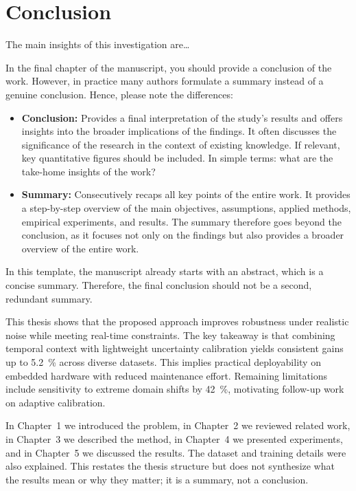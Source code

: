 \chapter{Conclusion}
\label{cha:conclusion}

The main insights of this investigation are\ldots
\begin{infobox}[title={Conclusion vs. summary}]
	In the final chapter of the manuscript, you should provide a conclusion of the work. However, in practice many authors formulate a summary instead of a genuine conclusion. Hence, please note the differences:
	\begin{itemize}
		\item \textbf{Conclusion:} Provides a final interpretation of the study's results and offers insights into the broader implications of the findings. It often discusses the significance of the research in the context of existing knowledge. If relevant, key quantitative figures should be included. In simple terms: what are the take-home insights of the work?
		\item \textbf{Summary:} Consecutively recaps all key points of the entire work. It provides a step-by-step overview of the main objectives, assumptions, applied methods, empirical experiments, and results. The summary therefore goes beyond the conclusion, as it focuses not only on the findings but also provides a broader overview of the entire work.
	\end{itemize}
	In this template, the manuscript already starts with an abstract, which is a concise summary. Therefore, the final conclusion should not be a second, redundant summary.
\end{infobox}

\begin{successbox}[title={Correct conclusion -- example}]
	This thesis shows that the proposed approach improves robustness under realistic noise while meeting real-time constraints. The key takeaway is that combining temporal context with lightweight uncertainty calibration yields consistent gains up to \SI{5.2}{\percent} across diverse datasets. This implies practical deployability on embedded hardware with reduced maintenance effort. Remaining limitations include sensitivity to extreme domain shifts by \SI{42}{\percent}, motivating follow-up work on adaptive calibration.
\end{successbox}

\begin{errorbox}[title={Incorrect conclusion (summary) -- example}]
	In Chapter~1 we introduced the problem, in Chapter~2 we reviewed related work, in Chapter~3 we described the method, in Chapter~4 we presented experiments, and in Chapter~5 we discussed the results. The dataset and training details were also explained. This restates the thesis structure but does not synthesize what the results mean or why they matter; it is a summary, not a conclusion.
\end{errorbox}

